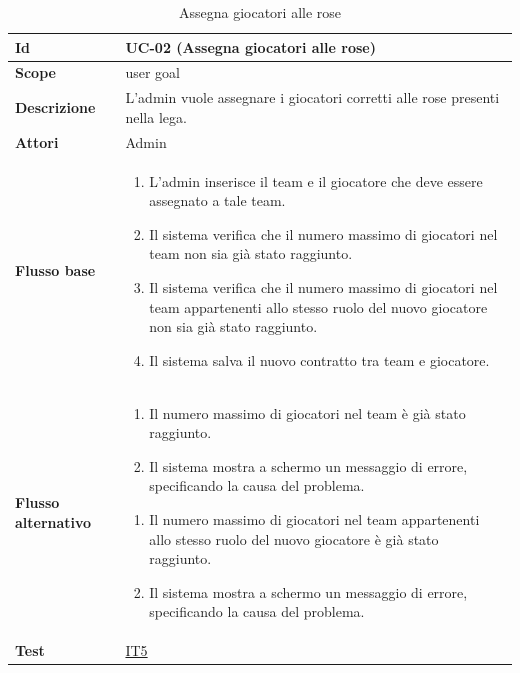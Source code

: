 \begin{table}[H]
\caption{Assegna giocatori alle rose}
\label{UC-02}

\begin{tabularx}{\textwidth}{|l|X|}
\hline
\textbf{Id} & UC-02 (Assegna giocatori alle rose) \\
\hline
\textbf{Scope} & user goal \\
\hline
\textbf{Descrizione} & L'admin vuole assegnare i giocatori corretti alle rose presenti nella lega. \\
\hline
\textbf{Attori} & Admin \\
\hline
\textbf{Flusso base} &
\begin{enumerate}[leftmargin=*]
    \item L'admin inserisce il team e il giocatore che deve essere assegnato a tale team.
    \item Il sistema verifica che il numero massimo di giocatori nel team non sia già stato raggiunto.
    \item Il sistema verifica che il numero massimo di giocatori nel team appartenenti allo 
            stesso ruolo del nuovo giocatore non sia già stato raggiunto.
    \item Il sistema salva il nuovo contratto tra team e giocatore.
\end{enumerate} \\
\hline
\textbf{Flusso alternativo} &
\begin{enumerate}[leftmargin=*,label=2.\arabic*]
    \item Il numero massimo di giocatori nel team è già stato raggiunto.
    \item Il sistema mostra a schermo un messaggio di errore, specificando la causa del problema.
\end{enumerate}
\begin{enumerate}[leftmargin=*,label=3.\arabic*]
    \item Il numero massimo di giocatori nel team appartenenti allo stesso ruolo
            del nuovo giocatore è già stato raggiunto.
    \item Il sistema mostra a schermo un messaggio di errore, specificando la causa del problema.
\end{enumerate} \\
\hline
\textbf{Test} & \hyperref[IT5]{IT5} \\
\hline
\end{tabularx}

\end{table}



